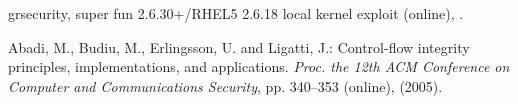 \documentclass[english,sigrecommended,JIP]{ipsj}
\begin{document}
\begin{thebibliography}{99}
  grsecurity, super fun 2.6.30+/RHEL5 2.6.18 local kernel exploit (online),  .%
 

  Abadi, M., Budiu, M., Erlingsson, U. and Ligatti, J.: Control-flow integrity principles, implementations, and applications. \textit{Proc. the 12th ACM Conference on Computer and Communications Security}, pp. 340--353 (online),  (2005).
 


\end{thebibliography}
\end{document}
